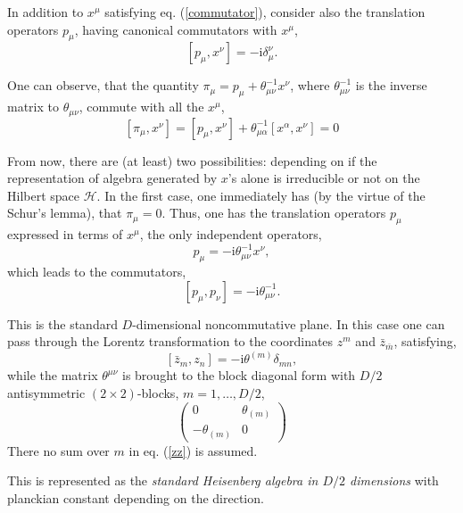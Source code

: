 \documentclass[a4paper]{amsart}
\newcommand{\ii}{\mathrm{i}}
\newcommand{\hh}{\mathcal{H}}
\begin{document}
In addition to $x^\mu$ satisfying eq. (\ref{commutator}), consider
also the translation operators $p_\mu$, having canonical
commutators with $x^\mu$,
\begin{equation}\label{pmu}
  [p_\mu,x^\nu]=-\ii \delta_\mu^\nu.
\end{equation}

One can observe, that the quantity
$\pi_\mu=p_\mu+\theta^{-1}_{\mu\nu}x^\nu$, where
$\theta^{-1}_{\mu\nu}$ is the inverse matrix to $\theta_{\mu\nu}$,
commute with all the $x^\mu$,
\begin{equation}\label{zero}
  [\pi_\mu,x^\nu]=[p_\mu,x^\nu]+\theta^{-1}_{\mu\alpha}
  [x^\alpha,x^\nu]=0
\end{equation}


From now, there are (at least) two possibilities: depending on if
the representation of algebra generated by $x$'s alone is
irreducible or not on the Hilbert space $\hh$. In the first case,
one immediately has (by the virtue of the Schur's lemma), that
$\pi_\mu=0$. Thus, one has the translation operators $p_\mu$
expressed in terms of $x^\mu$, the only independent operators,
\begin{equation}\label{irrep}
  p_\mu=-\ii \theta^{-1}_{\mu\nu}x^\nu,
\end{equation}
which leads to the commutators,
\begin{equation}\label{[pp]}
  [p_\mu,p_\nu]=-\ii \theta^{-1}_{\mu\nu}.
\end{equation}

This is the standard $D$-dimensional noncommutative plane. In this
case one can pass through the Lorentz transformation to the
coordinates $z^m$ and $\bar{z}_{\bar{m}}$, satisfying,
\begin{equation}\label{zz}
  [\bar{z}_m,z_n]=-\ii \theta^{(m)}\delta_{m n},
\end{equation}
while the matrix $\theta^{\mu\nu}$ is brought to the block
diagonal form with $D/2$ antisymmetric $(2\times 2)$-blocks,
$m=1,\dots,D/2$,
\begin{equation*}
  \begin{pmatrix}
  0&\theta_{(m)}\\
  -\theta_{(m)}&0
  \end{pmatrix}
\end{equation*}
There no sum over $m$ in eq. (\ref{zz}) is assumed.

This is represented as the \emph{standard Heisenberg algebra in
$D/2$ dimensions} with planckian constant depending on the
direction.
\end{document}
